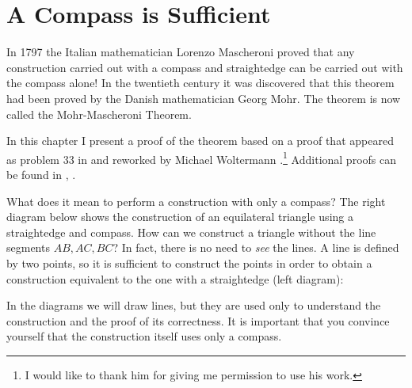 \chapter{A Compass is Sufficient}\label{c.compass-only}

In 1797 the Italian mathematician Lorenzo Mascheroni proved that any construction carried out with a compass and straightedge can be carried out with the compass alone! In the twentieth century it was discovered that this theorem had been proved by the Danish mathematician Georg Mohr. The theorem is now called the Mohr-Mascheroni Theorem.

In this chapter I present a proof of the theorem based on a proof that appeared as problem 33 in \cite{dorrie1} and reworked by  Michael Woltermann \cite{dorrie2}.\footnote{I would like to thank him for giving me permission to use his work.} Additional proofs can be found in \cite{mm}, \cite{stopel}.

What does it mean to perform a construction with only a compass? The right diagram below shows the construction of an equilateral triangle using a straightedge and compass. How can we construct a triangle without the line segments $AB, AC,BC$? In fact, there is no need to \emph{see} the lines. A line is defined by two points, so it is sufficient to construct the points in order to obtain a construction equivalent to the one with a straightedge (left diagram):
\begin{center}
\end{center}
In the diagrams we will draw lines, but they are used only to understand the construction and the proof of its correctness. It is important that you convince yourself that the construction itself uses only a compass.

